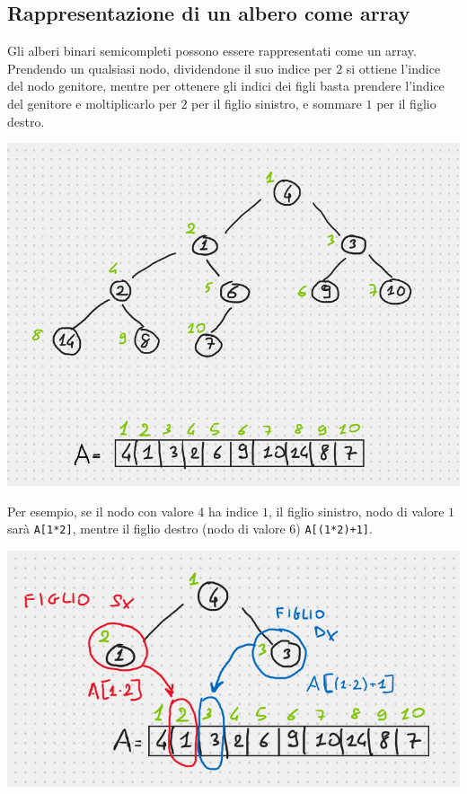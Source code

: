 \documentclass[a4paper,12pt,twoside]{report}
\begin{document}
\subsection{Rappresentazione di un albero come array}
Gli alberi binari semicompleti possono essere rappresentati come un array. Prendendo un qualsiasi nodo, dividendone il suo indice per $2$ si ottiene l'indice del nodo genitore, mentre per ottenere gli indici dei figli basta prendere l'indice del genitore e moltiplicarlo per $2$ per il figlio sinistro, e sommare $1$ per il figlio destro.
\begin{center}
\includegraphics[scale=0.55]{albero2array}
\end{center}
Per esempio, se il nodo con valore 4 ha indice $1$, il figlio sinistro, nodo di valore $1$ sar\`{a} \texttt{A[1*2]}, mentre il figlio destro (nodo di valore 6) \texttt{A[(1*2)+1]}.
\begin{center}
\includegraphics[scale = 0.6]{esempioa2a}
\end{center}
\end{document}
